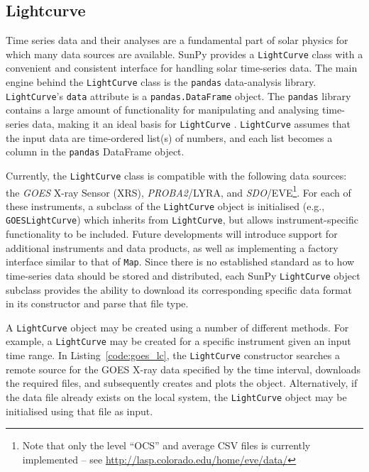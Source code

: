 \subsection{Lightcurve}\label{ssec:lightcurve}

Time series data and their analyses are a fundamental part of solar
physics for which many data sources are available.
SunPy provides a \texttt{LightCurve} class
with a convenient and consistent interface for handling solar time-series
data.  The main engine behind the \texttt{LightCurve} class is
the {\texttt{pandas}} data-analysis library.  
\texttt{LightCurve}'s \texttt{data} attribute is a \texttt{pandas.DataFrame} 
object. The \texttt{pandas} library contains a large amount
of functionality for manipulating and analysing time-series data,
making it an ideal basis for \texttt{LightCurve} \citep{mckinney2012}.  \texttt{LightCurve}
assumes that the input data are time-ordered list(s) of numbers, and each
list becomes a column in the \texttt{pandas} DataFrame object.

Currently, the \texttt{LightCurve} class is compatible with the
following data sources: the \textit{GOES} X-ray Sensor (XRS), \textit{PROBA2}/LYRA, and \textit{SDO}/EVE\footnote{Note that only the level ``OCS'' and
average CSV files is currently implemented -- see \url{http://lasp.colorado.edu/home/eve/data/}}.  For each of these instruments, a subclass of the
\texttt{LightCurve} object is initialised
(e.g., \texttt{GOESLightCurve}) which inherits from
\texttt{LightCurve}, but allows instrument-specific functionality to be
included.  Future developments will introduce support for additional
instruments and data products, as well as implementing a factory interface 
similar to that of \texttt{Map}.  Since there is no established standard
as to how time-series data should be stored and distributed, each SunPy 
\texttt{LightCurve} object subclass provides the ability to download its corresponding 
specific data format in its constructor and parse that file type.

A \texttt{LightCurve} object may be created using a number of different methods. 
For example, a \texttt{LightCurve} may be created for a specific instrument given
an input time range. In Listing~\ref{code:goes_lc}, 
the \texttt{LightCurve} constructor searches a remote source for the GOES X-ray 
data specified by the time interval, downloads the required files, and 
subsequently creates and plots the object. Alternatively, if the data file 
already exists on the local system, the \texttt{LightCurve} object may be 
initialised using that file as input.

